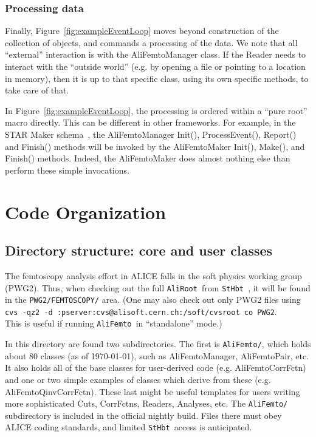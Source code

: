 \documentclass[twoside]{article}
\newcommand{\name}[1]{\textsf{#1}}%
\newcommand{\AliFemto}{{\tt AliFemto }}
\newcommand{\AliRoot}{{\tt AliRoot }}
\newcommand{\cvs}{{\tt StHbt }}
\begin{document}
\subsubsection{Processing data}
\label{sec:ProcessingData}


Finally, Figure~\ref{fig:exampleEventLoop} moves beyond construction of the collection
of objects, and commands a processing of the data.  We note that all ``external'' interaction
is with the AliFemtoManager class.  If the Reader needs to interact with the ``outside world''
(e.g. by opening a file or pointing to a location in memory), then it is up to that specific
class, using its own specific methods, to take care of that.

In Figure~\ref{fig:exampleEventLoop}, the processing is ordered within a ``pure root'' macro
directly.  This can be different in other frameworks.  For example, in the STAR Maker schema~\cite{StarMaker},
the AliFemtoManager Init(), ProcessEvent(), Report() and Finish() methods will be invoked by the AliFemtoMaker
Init(), Make(), and Finish() methods.  Indeed, the AliFemtoMaker does almost nothing else than perform these
simple invocations.


\section{Code Organization}


\subsection{Directory structure: core and user classes}
\label{sec:coreUser}

The femtoscopy analysis effort in ALICE falls in the soft physics working group (PWG2).
Thus, when checking out the full \AliRoot from \cvs, it will be found in the {\tt PWG2/FEMTOSCOPY/}
area.  (One may also check out only PWG2 files using\\
{\tt cvs -qz2 -d :pserver:cvs@alisoft.cern.ch:/soft/cvsroot co PWG2}.\\  This is useful if running
\AliFemto in ``standalone'' mode.)

In this directory are found two subdirectories.  The first is {\tt AliFemto/},
which holds about 80 classes (as of \today), such as \name{AliFemtoManager}, \name{AliFemtoPair}, etc.
It also holds all of the base classes for user-derived code (e.g. \name{AliFemtoCorrFctn}) and one
or two simple examples of classes which derive from these (e.g. \name{AliFemtoQinvCorrFctn}).  These
last might be useful templates for users writing more sophisticated Cuts, CorrFctns, Readers, Analyses, etc.
The {\tt AliFemto/} subdirectory is included in the official nightly build.  Files there must obey
ALICE coding standards, and limited \cvs access is anticipated.
\end{document}
